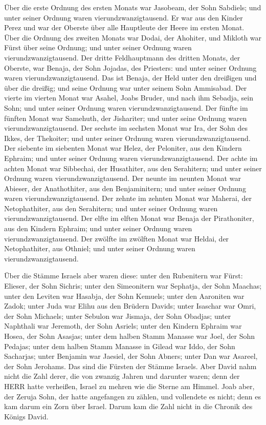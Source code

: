  Über die erste Ordnung des ersten Monats war Jasobeam, der
Sohn Sabdiels; und unter seiner Ordnung waren vierundzwanzigtausend.
 Er war aus den Kinder Perez und war der Oberste über alle
Hauptleute der Heere im ersten Monat.  Über die Ordnung des
zweiten Monats war Dodai, der Ahohiter, und Mikloth war Fürst über seine
Ordnung; und unter seiner Ordnung waren vierundzwanzigtausend.
 Der dritte Feldhauptmann des dritten Monats, der Oberste,
war Benaja, der Sohn Jojadas, des Priesters: und unter seiner Ordnung
waren vierundzwanzigtausend.  Das ist Benaja, der Held unter
den dreißigen und über die dreißig; und seine Ordnung war unter seinem
Sohn Ammisabad.  Der vierte im vierten Monat war Asahel,
Joabs Bruder, und nach ihm Sebadja, sein Sohn; und unter seiner Ordnung
waren vierundzwanzigtausend.  Der fünfte im fünften Monat
war Samehuth, der Jishariter; und unter seine Ordnung waren
vierundzwanzigtausend.  Der sechste im sechsten Monat war
Ira, der Sohn des Ikkes, der Thekoiter; und unter seiner Ordnung waren
vierundzwanzigtausend.  Der siebente im siebenten Monat war
Helez, der Peloniter, aus den Kindern Ephraim; und unter seiner Ordnung
waren vierundzwanzigtausend.  Der achte im achten Monat war
Sibbechai, der Husathiter, aus den Serahitern; und unter seiner Ordnung
waren vierundzwanzigtausend.  Der neunte im neunten Monat
war Abieser, der Anathothiter, aus den Benjaminitern; und unter seiner
Ordnung waren vierundzwanzigtausend.  Der zehnte im zehnten
Monat war Maherai, der Netophathiter, aus den Serahitern; und unter
seiner Ordnung waren vierundzwanzigtausend.  Der elfte im
elften Monat war Benaja der Pirathoniter, aus den Kindern Ephraim; und
unter seiner Ordnung waren vierundzwanzigtausend.  Der
zwölfte im zwölften Monat war Heldai, der Netophathiter, aus Othniel;
und unter seiner Ordnung waren vierundzwanzigtausend.

 Über die Stämme Israels aber waren diese: unter den
Rubenitern war Fürst: Elieser, der Sohn Sichris; unter den Simeonitern
war Sephatja, der Sohn Maachas;  unter den Leviten war
Hasabja, der Sohn Kemuels; unter den Aaroniten war Zadok; 
unter Juda war Elihu aus den Brüdern Davids; unter Isaschar war Omri,
der Sohn Michaels;  unter Sebulon war Jismaja, der Sohn
Obadjas; unter Naphthali war Jeremoth, der Sohn Asriels; 
unter den Kindern Ephraim war Hosea, der Sohn Asasjas; unter dem halben
Stamm Manasse war Joel, der Sohn Pedajas;  unter dem halben
Stamm Manasse in Gilead war Iddo, der Sohn Sacharjas; unter Benjamin war
Jaesiel, der Sohn Abners;  unter Dan war Asareel, der Sohn
Jerohams. Das sind die Fürsten der Stämme Israels.  Aber
David nahm nicht die Zahl derer, die von zwanzig Jahren und darunter
waren; denn der HERR hatte verheißen, Israel zu mehren wie die Sterne am
Himmel.  Joab aber, der Zeruja Sohn, der hatte angefangen
zu zählen, und vollendete es nicht; denn es kam darum ein Zorn über
Israel. Darum kam die Zahl nicht in die Chronik des Königs David.

